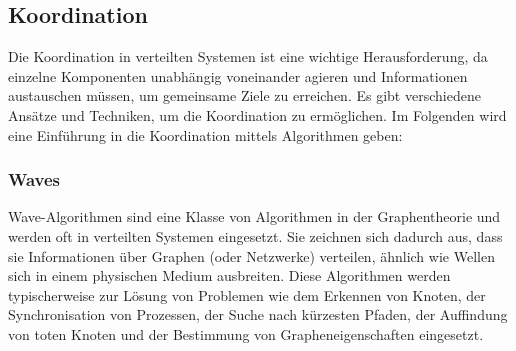 \subsection{Koordination}

Die Koordination in verteilten Systemen ist eine wichtige Herausforderung, da einzelne Komponenten unabhängig voneinander agieren und Informationen austauschen müssen, um gemeinsame Ziele zu erreichen. Es gibt verschiedene Ansätze und Techniken, um die Koordination zu ermöglichen. Im Folgenden wird eine Einführung in die Koordination mittels Algorithmen geben:

\subsubsection{Waves}
Wave-Algorithmen sind eine Klasse von Algorithmen in der Graphentheorie und werden oft in verteilten Systemen eingesetzt. Sie zeichnen sich dadurch aus, dass sie Informationen über Graphen (oder Netzwerke) verteilen, ähnlich wie Wellen sich in einem physischen Medium ausbreiten. Diese Algorithmen werden typischerweise zur Lösung von Problemen wie dem Erkennen von Knoten, der Synchronisation von Prozessen, der Suche nach kürzesten Pfaden, der Auffindung von toten Knoten und der Bestimmung von Grapheneigenschaften eingesetzt.

